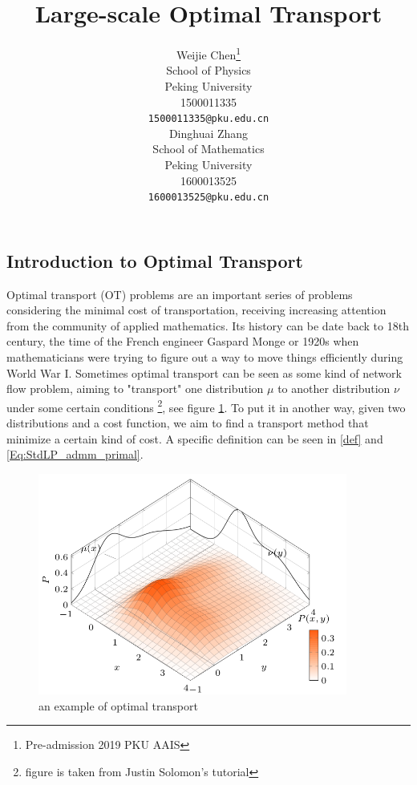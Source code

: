 \documentclass{article}
\title{Large-scale Optimal Transport}
\author{
  Weijie Chen\thanks{Pre-admission 2019 PKU AAIS} \\
  School of Physics\\
  Peking University\\
  1500011335 \\
  \texttt{1500011335@pku.edu.cn} \\
  \And
  Dinghuai Zhang \\
  School of Mathematics\\
  Peking University\\
  1600013525\\
  \texttt{1600013525@pku.edu.cn} \\
}
\begin{document}

\maketitle

%  

\begin{large}
\section{Introduction to Optimal Transport}
Optimal transport (OT) problems are an important series of problems considering the minimal cost of transportation, receiving increasing attention from the community of applied mathematics. Its history can be date back to 18th century, the time of the French engineer Gaspard Monge or 1920s when mathematicians were trying to figure out a way to move things efficiently during World War I. Sometimes optimal transport can be seen as some kind of network flow problem, aiming to "transport" one distribution $\mu$ to another distribution $\nu$ under some certain conditions \footnote{figure is taken from Justin Solomon's tutorial}, see figure \ref{fig:ot}. To put it in another way, given two distributions and a cost function, we aim to find a transport method that minimize a certain kind of cost. A specific definition can be seen in \ref{def} and \ref{Eq:StdLP_admm_primal}.

\begin{figure}[htbp] %
   \centering
   \includegraphics[width=4in]{ot.png} 
   \caption{an example of optimal transport}
   \label{fig:ot}
\end{figure}


\end{large}
\end{document}
